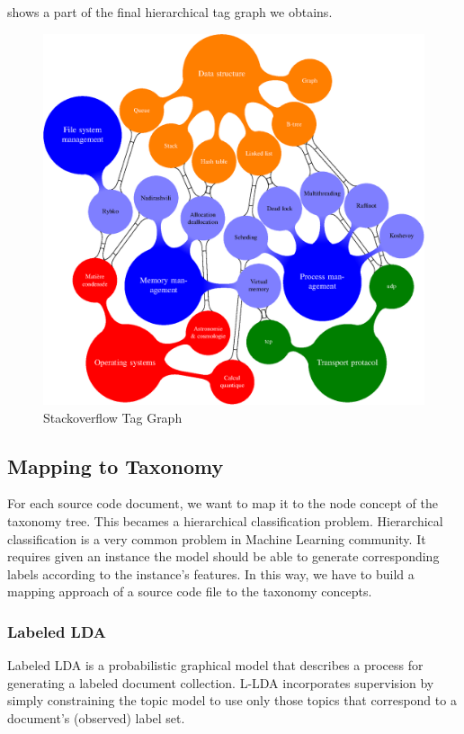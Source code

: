  shows a part of the final hierarchical tag graph we
obtains.

\begin{figure}[h]
\begin{center}
\includegraphics[width=0.9\columnwidth]{figure/tagraph.eps}
\caption{Stackoverflow Tag Graph}
\label{fig:tagraph}
\end{center}
\end{figure}

\subsection{Mapping to Taxonomy}
\label{sec:map}

For each source code document, we want to map it to the node concept of the 
taxonomy tree. This becames a hierarchical classification problem. 
Hierarchical classification is a very common problem in Machine
Learning community. It requires given an instance the model should
be able to generate corresponding labels according to the instance's
features. In this way, we have to build a mapping approach of a source code 
file to the taxonomy concepts.

\subsubsection{Labeled LDA}
Labeled LDA is a probabilistic graphical model that describes a process for 
generating a labeled document collection. L-LDA incorporates supervision by 
simply constraining the topic model to use only those topics that correspond 
to a document’s (observed) label set.

